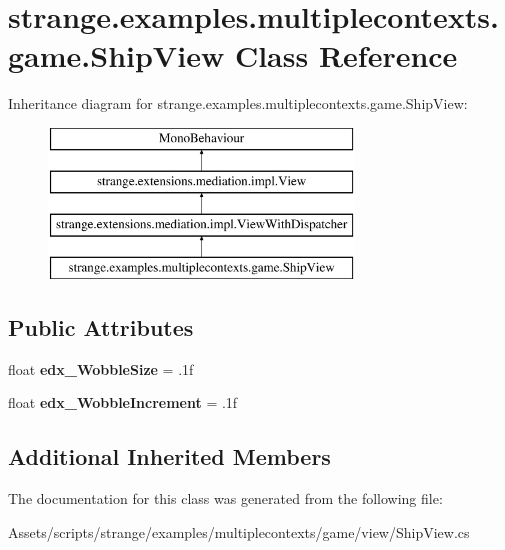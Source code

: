 \hypertarget{classstrange_1_1examples_1_1multiplecontexts_1_1game_1_1_ship_view}{\section{strange.\-examples.\-multiplecontexts.\-game.\-Ship\-View Class Reference}
\label{classstrange_1_1examples_1_1multiplecontexts_1_1game_1_1_ship_view}
}
Inheritance diagram for strange.\-examples.\-multiplecontexts.\-game.\-Ship\-View\-:\begin{figure}[H]
\begin{center}
\leavevmode
\includegraphics[height=4.000000cm]{classstrange_1_1examples_1_1multiplecontexts_1_1game_1_1_ship_view}
\end{center}
\end{figure}
\subsection*{Public Attributes}
\begin{DoxyCompactItemize}
\item 
\hypertarget{classstrange_1_1examples_1_1multiplecontexts_1_1game_1_1_ship_view_a0b13891065a4c9316b41a19cf073fe78}{float {\bfseries edx\-\_\-\-Wobble\-Size} = .\-1f}\label{classstrange_1_1examples_1_1multiplecontexts_1_1game_1_1_ship_view_a0b13891065a4c9316b41a19cf073fe78}

\item 
\hypertarget{classstrange_1_1examples_1_1multiplecontexts_1_1game_1_1_ship_view_a9057465001e57f7fdfe4719ed8ab9ab1}{float {\bfseries edx\-\_\-\-Wobble\-Increment} = .\-1f}\label{classstrange_1_1examples_1_1multiplecontexts_1_1game_1_1_ship_view_a9057465001e57f7fdfe4719ed8ab9ab1}

\end{DoxyCompactItemize}
\subsection*{Additional Inherited Members}


The documentation for this class was generated from the following file\-:\begin{DoxyCompactItemize}
\item 
Assets/scripts/strange/examples/multiplecontexts/game/view/Ship\-View.\-cs\end{DoxyCompactItemize}
